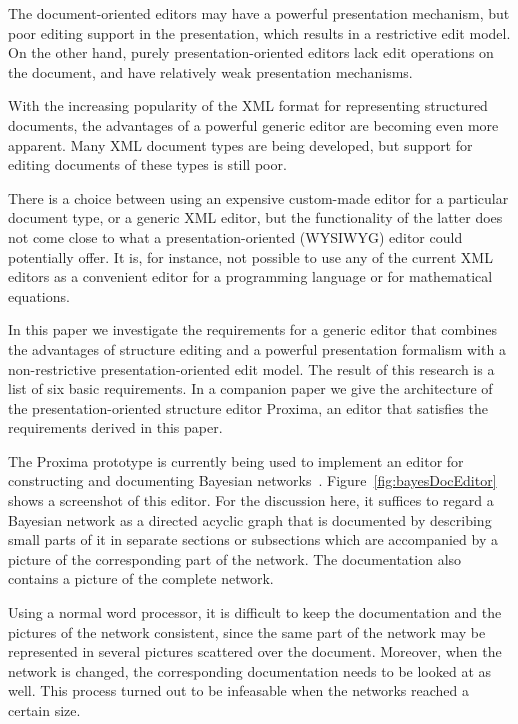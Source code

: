 \documentclass{speauth}
\begin{document}
The document-oriented editors may have a powerful presentation mechanism, but poor editing support in the presentation, which results in a restrictive edit model. On the other hand,  purely presentation-oriented editors lack edit operations on the document, and have relatively weak presentation mechanisms.

With the increasing popularity of the XML format for representing structured documents, the advantages of a powerful generic editor are becoming even more apparent. Many XML document types are being developed, but support for editing documents of these types is still poor. 

There is a choice between using an expensive custom-made editor for a particular document type, or a generic XML editor, but the functionality of the latter does not come close to what a presentation-oriented (WYSIWYG) editor could potentially offer. It is, for instance, not possible to use any of the current XML editors as a convenient editor for a programming language or for mathematical equations.

In this paper we investigate the requirements for a generic editor that combines the advantages of structure editing and a powerful presentation formalism with a non-restrictive presentation-oriented edit model. The result of this research is a list of six basic requirements. In a companion paper we give the architecture of the presentation-oriented structure editor Proxima, an editor that satisfies  the requirements derived in this paper.

\cbstart

The Proxima prototype is currently being used to implement an editor for constructing and documenting Bayesian networks~\cite{Jensen2001BayesianNetworks}. Figure~\ref{fig:bayesDocEditor} shows a screenshot of this editor. For the discussion here, it suffices to regard a Bayesian network as a directed acyclic graph that is documented by describing small parts of it in separate sections or subsections which are accompanied by a picture of the corresponding part of the network. The documentation also contains a picture of the complete network.

Using a normal word processor, it is difficult to keep the documentation and the pictures of the network consistent, since the same part of the network may be represented in several pictures scattered over the document. Moreover, when the network is changed, the corresponding documentation needs to be looked at as well. This process turned out to be infeasable when the networks reached a certain size.
\end{document}
